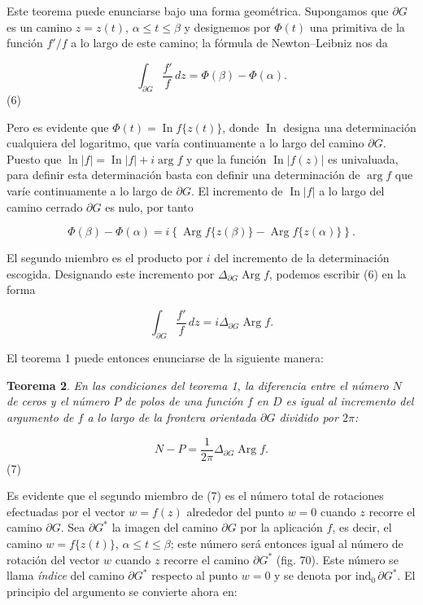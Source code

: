 \documentclass{article}
\begin{document}
Este teorema puede enunciarse bajo una forma geométrica. Supongamos que \(\partial G\) es un camino \(z = z(t)\), \(\alpha \leq t \leq \beta\) y designemos por \(\Phi(t)\) una primitiva de la función \(f'/f\) a lo largo de este camino; la fórmula de Newton--Leibniz nos da

\[\int_{\partial G} \frac{f'}{f}\, dz = \Phi(\beta) - \Phi(\alpha).\] 
(6)

Pero es evidente que \(\Phi(t) = \operatorname{In} f\{z(t)\}\), donde \(\operatorname{In}\) designa una determinación cualquiera del logaritmo, que varía continuamente a lo largo del camino \(\partial G\). Puesto que \(\ln|f| = \operatorname{In}|f| + i \arg f\) y que la función \(\operatorname{In}|f(z)|\) es univaluada, para definir esta determinación basta con definir una determinación de \(\arg f\) que varíe continuamente a lo largo de \(\partial G\). El incremento de \(\operatorname{In}|f|\) a lo largo del camino cerrado \(\partial G\) es nulo, por tanto

\[\Phi(\beta) - \Phi(\alpha) = i \left\{ \operatorname{Arg} f\{z(\beta)\} - \operatorname{Arg} f\{z(\alpha)\} \right\}.\]

El segundo miembro es el producto por \(i\) del incremento de la determinación escogida. Designando este incremento por \(\Delta_{\partial G} \operatorname{Arg} f\), podemos escribir (6) en la forma

\[\int_{\partial G} \frac{f'}{f}\, dz = i \Delta_{\partial G} \operatorname{Arg} f.\]

El teorema 1 puede entonces enunciarse de la siguiente manera:

\begin{theorem}
\textbf{Teorema 2}. \textit{En las condiciones del teorema 1, la diferencia entre el número \(N\) de ceros y el número \(P\) de polos de una función \(f\) en \(D\) es igual al incremento del argumento de \(f\) a lo largo de la frontera orientada \(\partial G\) dividido por \(2\pi\):}

\[N - P = \frac{1}{2\pi} \Delta_{\partial G} \operatorname{Arg} f.\] 
(7)
\end{theorem}

Es evidente que el segundo miembro de (7) es el número total de rotaciones efectuadas por el vector \(w = f(z)\) alrededor del punto \(w = 0\) cuando \(z\) recorre el camino \(\partial G\). Sea \(\partial G^*\) la imagen del camino \(\partial G\) por la aplicación \(f\), es decir, el camino \(w = f\{z(t)\}\), \(\alpha \leq t \leq \beta\); este número será entonces igual al número de rotación del vector \(w\) cuando \(z\) recorre el camino \(\partial G^*\) (fig. 70). Este número se llama \textit{índice} del camino \(\partial G^*\) respecto al punto \(w = 0\) y se denota por \(\text{ind}_0\, \partial G^*\). El principio del argumento se convierte ahora en:
\end{document}
